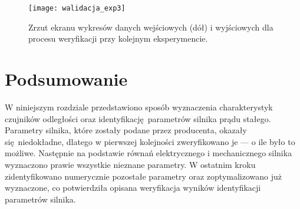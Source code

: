 \begin{figure}[h]
    \centering
    \texttt{[image: walidacja\_exp3]}
    \caption{Zrzut ekranu wykresów danych wejściowych (dół) i wyjściowych dla procesu weryfikacji przy kolejnym eksperymencie.}
    \label{fig:silnik_nieudana_weryfikacja_parametrow}
\end{figure}



\section{Podsumowanie}

W niniejszym rozdziale przedstawiono sposób wyznaczenia charakterystyk czujników odległości oraz identyfikację parametrów silnika prądu stałego. Parametry silnika, które zostały podane przez producenta, okazały się niedokładne, dlatego w pierwszej kolejności zweryfikowano je --- o ile było to możliwe. Następnie na podstawie równań elektrycznego i mechanicznego silnika wyznaczono prawie wszystkie nieznane parametry. W ostatnim kroku zidentyfikowano numerycznie pozostałe parametry oraz zoptymalizowano już wyznaczone, co potwierdziła opisana weryfikacja wyników identyfikacji parametrów silnika.

